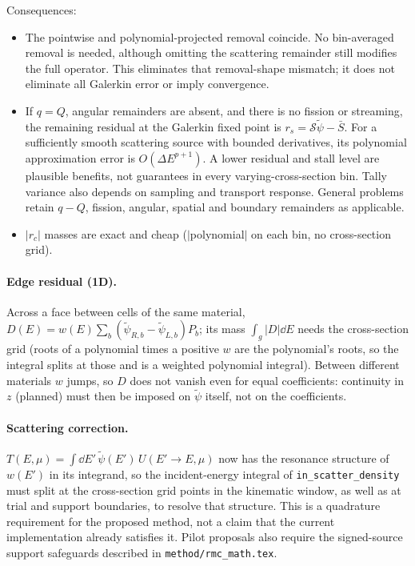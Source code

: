 \documentclass[11pt]{article}
\newcommand{\tpsi}{\tilde\psi}
\newcommand{\Sbar}{\bar S}
\begin{document}
\noindent Consequences:
\begin{itemize}
  \item The pointwise and polynomial-projected removal coincide. No bin-averaged
  removal is needed, although omitting the scattering remainder still modifies the
  full operator. This eliminates that removal-shape mismatch; it does not eliminate
  all Galerkin error or imply convergence.
  \item If $q=Q$, angular remainders are absent, and there is no fission or streaming,
  the remaining residual at the Galerkin fixed point is
  $r_s=\mathcal S\tpsi-\Sbar$. For a sufficiently smooth scattering source with
  bounded derivatives, its polynomial approximation error is
  $O(\Delta E^{p+1})$. A lower residual and stall level are plausible benefits,
  not guarantees in every varying-cross-section bin. Tally variance also depends
  on sampling and transport response. General problems retain $q-Q$, fission,
  angular, spatial and boundary remainders as applicable.
  \item $|r_c|$ masses are exact and cheap ($|$polynomial$|$ on each bin, no
  cross-section grid).
\end{itemize}

\paragraph{Edge residual (1D).} Across a face between cells of the same material,
$D(E) = w(E)\sum_b(\tpsi_{R,b}-\tpsi_{L,b})P_b$; its mass $\int_g|D|\dd E$ needs the
cross-section grid (roots of a polynomial times a positive $w$ are the polynomial's
roots, so the integral splits at those and is a weighted polynomial integral). Between
different materials $w$ jumps, so $D$ does not vanish even for equal coefficients:
continuity in $z$ (planned) must then be imposed on $\tpsi$ itself, not on the
coefficients.

\paragraph{Scattering correction.} $T(E,\mu) = \int\dd E'\,\tpsi(E')\,U(E'\to E,\mu)$
now has the resonance structure of $w(E')$ in its integrand, so the incident-energy
integral of \texttt{in\_scatter\_density} must split at the cross-section grid points
in the kinematic window, as well as at trial and support boundaries, to resolve
that structure. This is a quadrature requirement for the proposed method, not
a claim that the current implementation already satisfies it. Pilot proposals
also require the signed-source support safeguards described in \texttt{method/rmc\_math.tex}.
\end{document}
